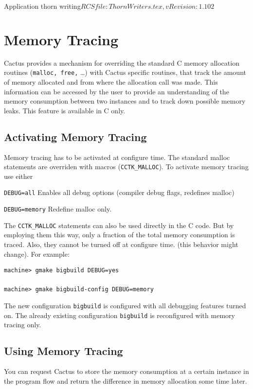 \begin{cactuspart}{2}{Application thorn writing}{$RCSfile: ThornWriters.tex,v $}{$Revision: 1.102 $}
\section{Memory Tracing}
\label{sec:metr}

Cactus provides a mechanism for overriding the standard C memory
allocation routines ({\tt malloc, free,} \ldots) with Cactus specific
routines, that track the amount of memory allocated and from where the
allocation call was made. This information can be accessed by the user
to provide an understanding of the memory consumption between two
instances and to track down possible memory leaks. This feature is
available in C only.

\subsection{Activating Memory Tracing}
\label{sec:acmetr}

Memory tracing has to be activated at configure time. The standard
malloc statements are overriden with macros ({\tt CCTK\_MALLOC}).  To
activate memory tracing use either

\begin{Lentry}
\item[{\tt DEBUG=all}]  Enables all debug options (compiler debug
flags, redefines malloc)
\item[{\tt DEBUG=memory}] Redefine malloc only.
\end{Lentry}

The {\tt CCTK\_MALLOC} statements can also be used directly in the C
code. But by employing them this way, only a fraction of the total
memory consumption is traced. Also, they cannot be turned off at
configure time. (this behavior might change). For example:
\begin{verbatim}
machine> gmake bigbuild DEBUG=yes

machine> gmake bigbuild-config DEBUG=memory
\end{verbatim}
The new configuration {\tt bigbuild} is configured with all debugging
features turned on. The already existing configuration {\tt bigbuild}
is reconfigured with memory tracing only.

\subsection{Using Memory Tracing}
\label{sec:usmetr}

You can  request Cactus to store the memory consumption at a certain
instance in the program flow and return the difference in memory
allocation some time later.


\end{cactuspart}
